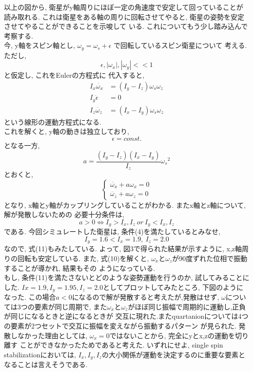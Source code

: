 \documentclass[class=article, crop=false, dvipdfmx, fleqn]{standalone}
\begin{document}
以上の図から, 衛星がy軸周りにほぼ一定の角速度で安定して回っていることが読み取れる.
これは衛星をある軸の周りに回転させてやると, 衛星の姿勢を安定させてやることができることを示唆して
いる. これについてもう少し踏み込んで考察する. \\
今, y軸をスピン軸とし, $\omega_y = \omega_s + \epsilon$ で回転しているスピン衛星について
考える. ただし,
\begin{equation}
   \epsilon,|\omega_x|,|\omega_y| << 1
\end{equation}
と仮定し, これをEulerの方程式に
代入すると,
\begin{align}
  I_x\dot{\omega_x} &= (I_y - I_z)\omega_s\omega_z \\
  I_y\dot{\epsilon} &= 0 \\
  I_z\dot{\omega_z} &= (I_x - I_y)\omega_s\omega_z
\end{align}
という線形の運動方程式になる. \\
これを解くと, y軸の動きは独立しており,
\begin{equation}
  \epsilon = const.
\end{equation}
となる一方,
\begin{equation}
  a = \frac{(I_y - I_z)(I_x - I_y)}{I_z}{\omega_s}^2
\end{equation}
とおくと,
\begin{equation}
  \begin{cases}
    \ddot{\omega_x} + a\omega_x = 0 \\
    \ddot{\omega_z} + a\omega_z = 0
  \end{cases}
\end{equation}
となり, x軸とy軸がカップリングしていることがわかる. またx軸とz軸について, 解が発散しないための
必要十分条件は,
\begin{equation}
  a > 0 \Leftrightarrow I_y > I_x, I_z \ or \ I_y < I_x, I_z
\end{equation}
である. 今回シミュレートした衛星は, 条件(4)を満たしているとみなせ,
\begin{equation}
  I_y = 1.6 < I_x= 1.9, \ I_z = 2.0
\end{equation}
なので, 式(11)もみたしている. よって, 図3で得られた結果が示すように, x,z軸周りの回転も安定している.
また, 式(10)を解くと, $\omega_x$と$\omega_z$が90度ずれた位相で振動することが導かれ, 結果もその
ようになっている. \\
もし, 条件(11)を満たさないとどのような姿勢運動を行うのか, 試してみることにした.
$Ix = 1.9, I_y = 1.95, I_z = 2.0$としてプロットしてみたところ, 下図のようになった.
この場合$a<0$になるので解が発散すると考えたが,発散はせず, $\omega$については3つの要素が同じ周期で,
また$\omega_x$と$\omega_z$がほぼ同じ振幅で周期的に運動し,正負が同じになるときと逆になるときが
交互に現れた.またquartanionについては4つの要素が2つセットで交互に振幅を変えながら振動するパターン
が見られた. 発散しなかった理由としては, $\omega_x=0$ではないことから, 完全にyとx,zの運動を切り離す
ことができなかったためであると考えた. いずれにせよ, single spin stabilizationにおいては,
$I_x, I_y, I_z$の大小関係が運動を決定するのに重要な要素となることは言えそうである.
\end{document}
